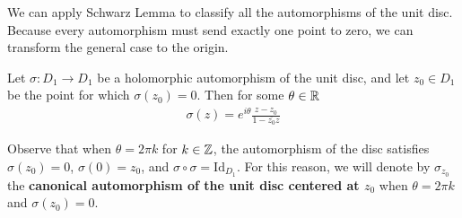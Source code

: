 \documentclass{memoir}
\begin{document}


We can apply Schwarz Lemma to classify all the automorphisms of the unit disc. Because every automorphism must send exactly one point to zero, we can transform the general case to the origin.

\begin{thm}
\label{thm:classification_of_automorphisms_of_the_unit_disc}
	Let \(\sigma :D_1\to D_1\) be a holomorphic automorphism of the unit disc, and let \(z_0\in D_1\) be the point for which \(\sigma (z_0 )=0\). Then for some \(\theta \in \mathbb{R}\)
	\begin{align*}
		\sigma (z) = e^{i\theta } \frac{z-z_0}{1-\overline{z_0}z}
	\end{align*}
\end{thm}

Observe that when \(\theta =2\pi k\) for \(k \in \mathbb{Z}\), the automorphism of the disc satisfies \(\sigma (z_0) = 0\), \(\sigma (0) = z_0\), and \(\sigma \circ \sigma  = \textrm{Id}_{D_1}\). For this reason, we will denote by \(\sigma_{z_0}\) the \textbf{canonical automorphism of the unit disc centered at \(z_0\)} when \(\theta =2\pi k\) and \(\sigma (z_0)=0\).
\end{document}
